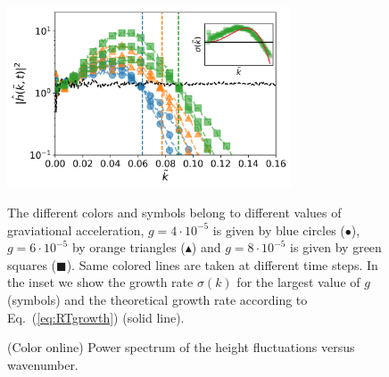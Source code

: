 \begin{figure}
    \centering
    \includegraphics[width=0.75\textwidth]{graphics/Fig_3_new_RTI_spectra_single_color_same_tau_capkc_correct_rescaled_x_axis_inset.png}
    \caption{(Color online) Power spectrum of the height fluctuations versus wavenumber.} The different colors and symbols belong to different values of graviational acceleration, $g=4\cdot 10^{-5}$ is given by blue circles (\textcolor{pyblue}{$\bullet$}), $g=6\cdot 10^{-5}$ by orange triangles (\textcolor{pyorange}{$\blacktriangle$}) and $g=8\cdot 10^{-5}$ is given by green squares (\textcolor{pygreen}{$\blacksquare$}). Same colored lines are taken at different time steps. In the inset we show the growth rate $\sigma(k)$ for the largest value of $g$ (symbols) and the theoretical growth rate according to Eq.~(\ref{eq:RTgrowth}) (solid line).
    \label{fig:RTI}
\end{figure}

